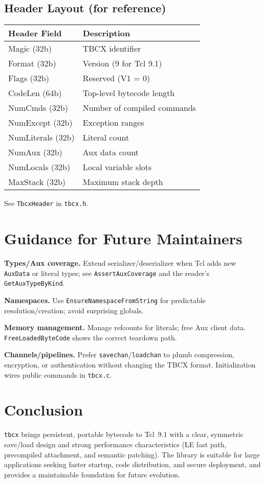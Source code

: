 \documentclass[11pt,a4paper]{article}
\begin{document}
\subsection{Header Layout (for reference)}
\begin{center}
\begin{tabular}{|l|l|}
\hline
\textbf{Header Field} & \textbf{Description} \\
\hline
Magic (32b) & TBCX identifier \\
Format (32b) & Version (9 for Tcl 9.1) \\
Flags (32b) & Reserved (V1 = 0) \\
CodeLen (64b) & Top-level bytecode length \\
NumCmds (32b) & Number of compiled commands \\
NumExcept (32b) & Exception ranges \\
NumLiterals (32b) & Literal count \\
NumAux (32b) & Aux data count \\
NumLocals (32b) & Local variable slots \\
MaxStack (32b) & Maximum stack depth \\
\hline
\end{tabular}
\end{center}
\noindent See \texttt{TbcxHeader} in \texttt{tbcx.h}.

\section{Guidance for Future Maintainers}
\textbf{Types/Aux coverage.} Extend serializer/deserializer when Tcl adds new \texttt{AuxData} or literal types; see \texttt{AssertAuxCoverage} and the reader’s \texttt{GetAuxTypeByKind}.

\noindent\textbf{Namespaces.} Use \texttt{EnsureNamespaceFromString} for predictable resolution/creation; avoid surprising globals.

\noindent\textbf{Memory management.} Manage refcounts for literals; free Aux client data. \texttt{FreeLoadedByteCode} shows the correct teardown path.

\noindent\textbf{Channels/pipelines.} Prefer \texttt{savechan}/\texttt{loadchan} to plumb compression, encryption, or authentication without changing the TBCX format. Initialization wires public commands in \texttt{tbcx.c}.

\section{Conclusion}
\texttt{tbcx} brings persistent, portable bytecode to Tcl~9.1 with a clear, symmetric save/load design and strong performance characteristics (LE fast path, precompiled attachment, and semantic patching). The library is suitable for large applications seeking faster startup, code distribution, and secure deployment, and provides a maintainable foundation for future evolution.
\end{document}
